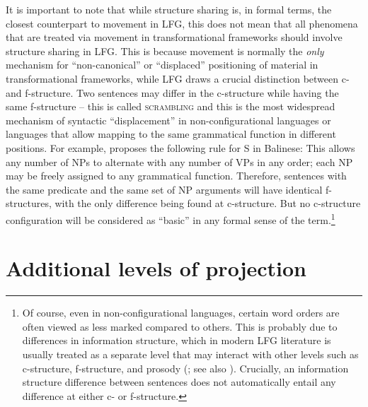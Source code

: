 \documentclass[output=paper]{langscibook}
\begin{document}
 It is important to note that while structure sharing is, in formal terms, the closest counterpart to movement in LFG, this does not mean that all phenomena that are treated via movement in transformational frameworks should involve structure sharing in LFG. This is because movement is normally the \textit{only} mechanism for ``non-canonical'' or ``displaced'' positioning of material in transformational frameworks, while LFG draws a crucial distinction between c- and f-structure. Two sentences may differ in the c-structure while having the same f-structure -- this is called \textsc{scrambling} and this is the most widespread mechanism of syntactic ``displacement'' in non-configurational languages or languages that allow mapping to the same grammatical function in different positions. For example, \textcite{arka2003} proposes the following rule for S in Balinese:
 \eas
 \zs
This allows any number of NPs to alternate with any number of VPs in any order; each NP may be freely assigned to any grammatical function. Therefore, sentences with the same predicate and the same set of NP arguments will have identical f-structures, with the only difference being found at c-structure. But no c-structure configuration will be considered as ``basic'' in any formal sense of the term.\footnote{Of course, even in non-configurational languages, certain word orders are often viewed as less marked compared to others. This is probably due to differences in information structure, which in modern LFG literature is usually treated as a separate level that may interact with other levels such as c-structure, f-structure, and prosody (; see also \citealt{DN}). Crucially, an information structure difference between sentences does not automatically entail any difference at either c- or f-structure.}
 
 \section{Additional levels of projection\label{sect:intro:addlevels}}
\end{document}
